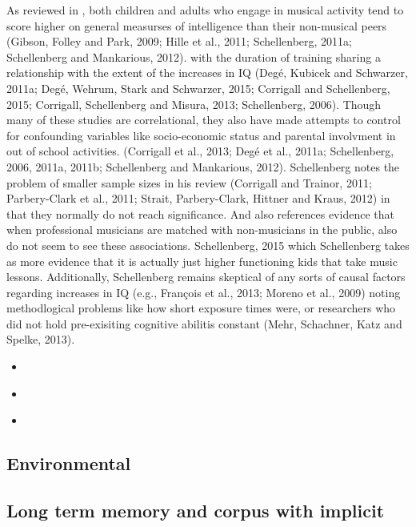 \documentclass[]{book}
\providecommand{\tightlist}{%
  \setlength{\itemsep}{0pt}\setlength{\parskip}{0pt}}
\theoremstyle{definition}
\theoremstyle{definition}
\theoremstyle{definition}
\theoremstyle{remark}
\begin{document}
As reviewed in \citep{schellenbergMusicNonmusicalAbilities2017}, both
children and adults who engage in musical activity tend to score higher
on general measurses of intelligence than their non-musical peers
(Gibson, Folley and Park, 2009; Hille et al., 2011; Schellenberg, 2011a;
Schellenberg and Mankarious, 2012). with the duration of training
sharing a relationship with the extent of the increases in IQ (Degé,
Kubicek and Schwarzer, 2011a; Degé, Wehrum, Stark and Schwarzer, 2015;
Corrigall and Schellenberg, 2015; Corrigall, Schellenberg and Misura,
2013; Schellenberg, 2006). Though many of these studies are
correlational, they also have made attempts to control for confounding
variables like socio-economic status and parental involvment in out of
school activities. (Corrigall et al., 2013; Degé et al., 2011a;
Schellenberg, 2006, 2011a, 2011b; Schellenberg and Mankarious, 2012).
Schellenberg notes the problem of smaller sample sizes in his review
(Corrigall and Trainor, 2011; Parbery-Clark et al., 2011; Strait,
Parbery-Clark, Hittner and Kraus, 2012) in that they normally do not
reach significance. And also references evidence that when professional
musicians are matched with non-musicians in the public, also do not seem
to see these associations. Schellenberg, 2015 which Schellenberg takes
as more evidence that it is actually just higher functioning kids that
take music lessons. Additionally, Schellenberg remains skeptical of any
sorts of causal factors regarding increases in IQ (e.g., François et
al., 2013; Moreno et al., 2009) noting methodlogical problems like how
short exposure times were, or researchers who did not hold pre-exisiting
cognitive abilitis constant (Mehr, Schachner, Katz and Spelke, 2013).

\begin{itemize}
\tightlist
\item
  \citep{corrigallMusicTrainingCognition2013}
\item
  \citep{corrigallMusicTrainingCognition2013a}
\item
  \citep{swaminathanRevisitingAssociationMusic2017}
\end{itemize}

\hypertarget{environmental}{%
\subsection{Environmental}\label{environmental}}

\hypertarget{long-term-memory-and-corpus-with-implicit}{%
\subsection{Long term memory and corpus with
implicit}\label{long-term-memory-and-corpus-with-implicit}}
\end{document}
